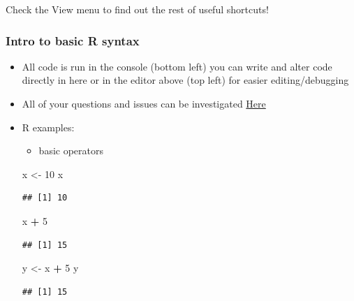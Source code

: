 \documentclass[
]{article}
\newenvironment{Shaded}{\begin{snugshade}}{\end{snugshade}}
\newcommand{\DecValTok}[1]{\textcolor[rgb]{0.00,0.00,0.81}{#1}}
\newcommand{\NormalTok}[1]{#1}
\newcommand{\OperatorTok}[1]{\textcolor[rgb]{0.81,0.36,0.00}{\textbf{#1}}}
\newcommand{\StringTok}[1]{\textcolor[rgb]{0.31,0.60,0.02}{#1}}
\providecommand{\tightlist}{%
  \setlength{\itemsep}{0pt}\setlength{\parskip}{0pt}}
\begin{document}
Check the View menu to find out the rest of useful shortcuts!

\hypertarget{intro-to-basic-r-syntax}{%
\subsubsection{Intro to basic R syntax}\label{intro-to-basic-r-syntax}}

\begin{itemize}
\tightlist
\item
  All code is run in the console (bottom left) you can write and alter
  code directly in here or in the editor above (top left) for easier
  editing/debugging
\item
  All of your questions and issues can be investigated
  \href{https://cran.r-project.org/doc/contrib/Paradis-rdebuts_en.pdf}{Here}
\item
  R examples:

  \begin{itemize}
  \tightlist
  \item
    basic operators
  \end{itemize}

\begin{Shaded}
\begin{Highlighting}[]
\NormalTok{x <-}\StringTok{ }\DecValTok{10}
\NormalTok{x}
\end{Highlighting}
\end{Shaded}

\begin{verbatim}
## [1] 10
\end{verbatim}

\begin{Shaded}
\begin{Highlighting}[]
\NormalTok{x }\OperatorTok{+}\StringTok{ }\DecValTok{5}
\end{Highlighting}
\end{Shaded}

\begin{verbatim}
## [1] 15
\end{verbatim}

\begin{Shaded}
\begin{Highlighting}[]
\NormalTok{y <-}\StringTok{ }\NormalTok{x }\OperatorTok{+}\StringTok{ }\DecValTok{5}
\NormalTok{y}
\end{Highlighting}
\end{Shaded}

\begin{verbatim}
## [1] 15
\end{verbatim}


\end{itemize}
\end{document}
